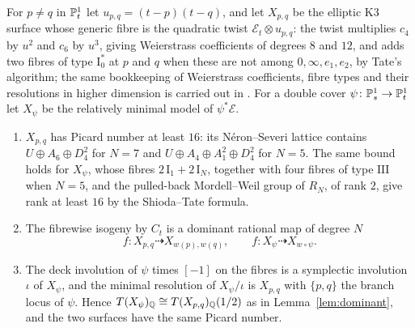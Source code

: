 For $p\ne q$ in $\mathbb{P}^{1}_{t}$ let $u_{p,q}=(t-p)(t-q)$, and let $X_{p,q}$ be the elliptic K3 surface whose generic fibre is the quadratic twist $\mathcal{E}_{t}\otimes u_{p,q}$: the twist multiplies $c_{4}$ by $u^{2}$ and $c_{6}$ by $u^{3}$, giving Weierstrass coefficients of degrees $8$ and $12$, and adds two fibres of type $\mathrm{I}_{0}^{*}$ at $p$ and $q$ when these are not among $0,\infty,e_{1},e_{2}$, by Tate's algorithm; the same bookkeeping of Weierstrass coefficients, fibre types and their resolutions in higher dimension is carried out in \cite{Bha26b}. For a double cover $\psi\colon\mathbb{P}^{1}_{s}\to\mathbb{P}^{1}_{t}$ let $X_{\psi}$ be the relatively minimal model of $\psi^{*}\mathcal{E}$.

\begin{lemma}\label{lem:twists}
\leavevmode
\begin{enumerate}[label=\textup{(\roman*)},leftmargin=2.4em,itemsep=2pt]
\item $X_{p,q}$ has Picard number at least $16$: its Néron--Severi lattice contains $U\oplus A_{6}\oplus D_{4}^{2}$ for $N=7$ and $U\oplus A_{4}\oplus A_{1}^{2}\oplus D_{4}^{2}$ for $N=5$. The same bound holds for $X_{\psi}$, whose fibres $2\,\mathrm{I}_{1}+2\,\mathrm{I}_{N}$, together with four fibres of type $\mathrm{III}$ when $N=5$, and the pulled-back Mordell--Weil group of $R_{N}$, of rank $2$, give rank at least $16$ by the Shioda--Tate formula.
\item The fibrewise isogeny by $C_{t}$ is a dominant rational map of degree $N$
\[
f\colon X_{p,q}\dashrightarrow X_{w(p),w(q)},\qquad f\colon X_{\psi}\dashrightarrow X_{w\circ\psi}.
\]
\item The deck involution of $\psi$ times $[-1]$ on the fibres is a symplectic involution $\iota$ of $X_{\psi}$, and the minimal resolution of $X_{\psi}/\iota$ is $X_{p,q}$ with $\{p,q\}$ the branch locus of $\psi$. Hence $T(X_{\psi})_{\mathbb{Q}}\cong T(X_{p,q})_{\mathbb{Q}}(1/2)$ as in Lemma~\ref{lem:dominant}, and the two surfaces have the same Picard number.
\end{enumerate}
\end{lemma}

